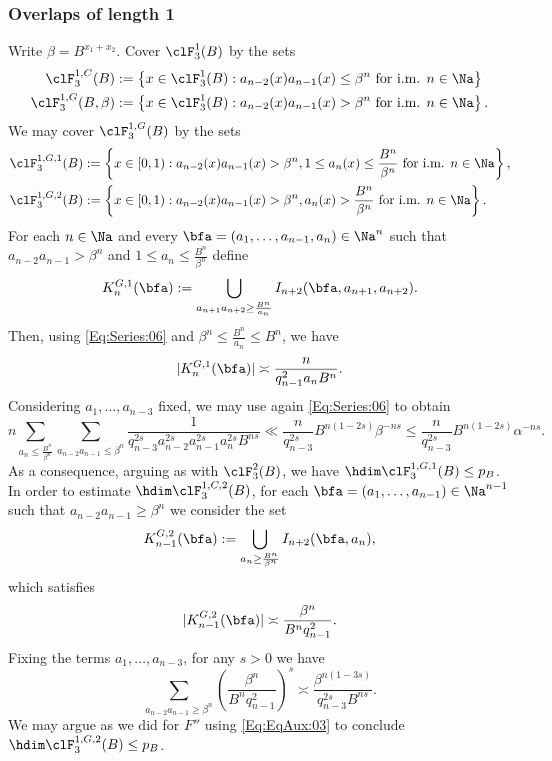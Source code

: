 \documentclass[12pt,a4paper]{amsart}
\begin{document}
\subsubsection{Overlaps of length 1}
Write $\beta=B^{x_1+x_2}$. Cover  $\clF_{3}^{1}(B)$ by the sets
\begin{align*}
\clF_{3}^{1,C}(B)
&:=
\left\{ x\in \clF_{3}^{1}(B): a_{n-2}(x)a_{n-1}(x) \leq \beta^n \text{ for i.m.  } n\in\Na \right\}\\
\clF_{3}^{1,G}(B,\beta)
&:=
\left\{ x\in \clF_{3}^{1}(B): a_{n-2}(x)a_{n-1}(x)> \beta^n \text{ for i.m.  } n\in\Na \right\}.
\end{align*}
We may cover $\clF_{3}^{1,G}(B)$ by the sets 
\begin{align*}
\clF_{3}^{1,G,1}(B)
&:=
\left\{ x\in[0,1): a_{n-2}(x)a_{n-1}(x)> \beta^n, 1\leq a_n(x)\leq \frac{B^n}{\beta^n}\text{ for i.m.   } n\in\Na \right\}, \\
\clF_{3}^{1,G,2}(B)
&:=
\left\{ x\in[0,1): a_{n-2}(x)a_{n-1}(x)> \beta^n, a_n(x)>\frac{B^n}{\beta^n}\text{ for i.m.   } n\in\Na \right\}.
\end{align*}
For each $n\in \Na$ and every $\bfa=(a_1,\ldots, a_{n-1}, a_n)\in \Na^n$ such that $a_{n-2}a_{n-1}> \beta^n$ and $1\leq a_n\leq \frac{B^n}{\beta^n}$ define 
\[
K_{n}^{G,1}(\bfa)
:=
\bigcup_{a_{n+1}a_{n+2}\geq \frac{B^n}{a_n}} 
I_{n+2}(\bfa, a_{n+1}, a_{n+2}).
\]
Then, using \eqref{Eq:Series:06} and $\beta^n \leq \frac{B^n}{a_n}\leq B^n$, we have 
\[
|K_{n}^{G,1}(\bfa)|
\asymp 
\frac{n}{q_{n-1}^2a_n B^n}.
\]
Considering $a_1,\ldots, a_{n-3}$ fixed, we may use again \eqref{Eq:Series:06} to obtain 
\[
n
\sum_{a_n\leq \frac{B^n}{\beta^n}} 
\sum_{a_{n-2}a_{n-1} \leq \beta^n} 
\frac{1}{q_{n-3}^{2s} a_{n-2}^{2s}a_{n-1}^{2s}a_{n}^{2s} B^{ns} }
\ll
\frac{n}{q_{n-3}^{2s}}B^{n(1-2s)}\beta^{-ns}
\leq 
\frac{n}{q_{n-3}^{2s}}B^{n(1-2s)}\alpha^{-ns}.
\]
As a consequence, arguing as with $\clF_3^2(B)$, we have $\hdim \clF_{3}^{1,G,1}(B) \leq p_B$. In order to estimate $\hdim \clF_{3}^{1,C,2}(B)$, for each $\bfa=(a_1,\ldots, a_{n-1}) \in\Na^{n-1}$ such that $a_{n-2}a_{n-1}\geq \beta^n$ we consider the set
\[
K_{n-1}^{G,2}(\bfa)
:=
\bigcup_{a_{n}\geq \frac{B^n}{\beta^n}} 
I_{n+2}(\bfa, a_{n}),
\]
which satisfies
\[
|K_{n-1}^{G,2}(\bfa)|
\asymp
\frac{\beta^n}{B^nq_{n-1}^2}.
\]
Fixing the terms $a_1,\ldots, a_{n-3}$, for any $s>0$ we have
\[
\sum_{a_{n-2}a_{n-1}\geq \beta^n}
\left( \frac{\beta^n}{B^nq_{n-1}^2}\right)^s 
\asymp
\frac{\beta^{n(1-3s)}}{q_{n-3}^{2s}B^{ns}}.
\]
We may argue as we did for $F''$ using \eqref{Eq:EqAux:03} to conclude $\hdim \clF_{3}^{1,G,2}(B)\leq p_B$.
\end{document}
